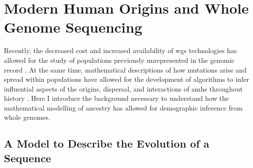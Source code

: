 %





\section{Modern Human Origins and Whole Genome Sequencing}

Recently, the decreased cost and increased availability of \gls{wgs} technologies has allowed for the study of populations previously unrepresented in the genomic record \cite{D2019,Wong2013,Wu2021,GS2019,Fan2019a}. At the same time, mathematical descriptions of how mutations arise and spread within populations have allowed for the development of algorithms to infer influential aspects of the origins, dispersal, and interactions of \glspl{amh} throughout history \cite{Hodgson2010}. Here I introduce the background necessary to understand how the mathematical modelling of ancestry has allowed for demographic inference from whole genomes. 


\subsection{A Model to Describe the Evolution of a Sequence}

